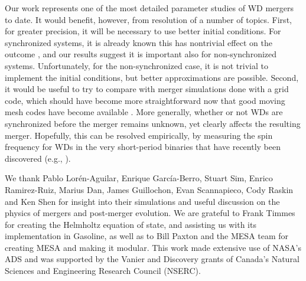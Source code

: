 Our work represents one of the most detailed parameter studies of WD mergers to date.  It would benefit, however, from resolution of a number of topics.  First, for greater precision, it will be necessary to use better initial conditions.  For synchronized systems, it is already known this has nontrivial effect on the outcome \citep{dan+11,dan+12}, and our results suggest it is important also for non-synchronized systems.  Unfortunately, for the non-synchronized case, it is not trivial to implement the initial conditions, but better approximations are possible.  Second, it would be useful to try to compare with merger simulations done with a grid code, which should have become more straightforward now that good moving mesh codes have become available \citep{spri10,duffm11}.  More generally, whether or not WDs are synchronized before the merger remains unknown, yet clearly affects the resulting merger.  Hopefully, this can be resolved empirically, by measuring the spin frequency for WDs in the very short-period binaries that have recently been discovered (e.g., \citealt{brow+11}).

We thank Pablo Lor\'{e}n-Aguilar, Enrique Garc\'{i}a-Berro, Stuart Sim, Enrico Ramirez-Ruiz, Marius Dan, James Guillochon, Evan Scannapieco, Cody Raskin and Ken Shen for insight into their simulations and useful discussion on the physics of mergers and post-merger evolution.  We are grateful to Frank Timmes for creating the Helmholtz equation of state, and assisting us with its implementation in Gasoline, as well as to Bill Paxton and the MESA team for creating MESA and making it modular.  This work made extensive use of NASA's ADS and was supported by the Vanier and Discovery grants of Canada's Natural Sciences and Engineering Research Council (NSERC).
